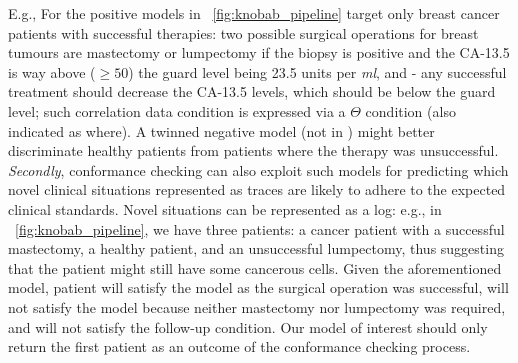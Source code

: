  E.g., For the positive models  in \figurename~\ref{fig:knobab_pipeline}   target only breast cancer patients with successful therapies:   two possible surgical operations for  breast tumours  are  mastectomy or lumpectomy if the biopsy is positive and the CA-13.5 is way above ($\geq 50$) the guard level being 23.5 units per \textit{ml},  and   -  any successful treatment should decrease the CA-13.5 levels, which should be below the guard level; such correlation data condition is expressed via a $\Theta$ condition (also indicated as  \textsf{where}). A twinned negative model (not in \figurename) might better discriminate healthy patients from patients where the therapy was unsuccessful.
\textit{Secondly}, conformance checking can also exploit such models
for predicting which novel clinical situations represented as %
traces are likely to adhere to the expected clinical standards. Novel situations can be represented as a log: e.g., in \figurename~\ref{fig:knobab_pipeline}, we have three patients:  a cancer patient with a successful mastectomy,  a healthy patient, and  an unsuccessful lumpectomy, thus suggesting that the patient might still have some cancerous cells. Given the aforementioned model, patient  will satisfy the model as the surgical operation was successful,    will not satisfy the model because neither mastectomy nor lumpectomy was required, and  will not satisfy the follow-up condition. Our model of interest should only return the first patient as an outcome of the conformance checking process.



